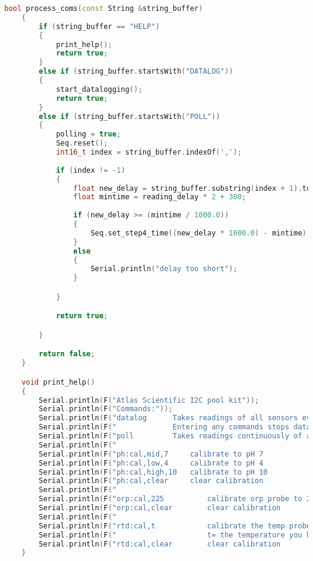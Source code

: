 \begin{lstlisting}[language=C++]
    bool process_coms(const String &string_buffer) 
    {
        if (string_buffer == "HELP") 
        {
            print_help();
            return true;
        }
        else if (string_buffer.startsWith("DATALOG")) 
        {
            start_datalogging();
            return true;
        }
        else if (string_buffer.startsWith("POLL")) 
        {
            polling = true;
            Seq.reset();
            int16_t index = string_buffer.indexOf(',');
            
            if (index != -1) 
            {
                float new_delay = string_buffer.substring(index + 1).toFloat();
                float mintime = reading_delay * 2 + 300;
                
                if (new_delay >= (mintime / 1000.0)) 
                {
                    Seq.set_step4_time((new_delay * 1000.0) - mintime);
                } 
                else 
                {
                    Serial.println("delay too short");
                }

            }

            return true;

        }

        return false;
    }

    void print_help() 
    {
        Serial.println(F("Atlas Scientific I2C pool kit"));
        Serial.println(F("Commands:"));
        Serial.println(F("datalog      Takes readings of all sensors every 15 sec send to thingspeak "));
        Serial.println(F("             Entering any commands stops datalog mode."));
        Serial.println(F("poll         Takes readings continuously of all sensors"));
        Serial.println(F("                                                                           "));
        Serial.println(F("ph:cal,mid,7     calibrate to pH 7                                         "));
        Serial.println(F("ph:cal,low,4     calibrate to pH 4                                         "));
        Serial.println(F("ph:cal,high,10   calibrate to pH 10                                        "));
        Serial.println(F("ph:cal,clear     clear calibration                                         "));
        Serial.println(F("                                                                           "));
        Serial.println(F("orp:cal,225          calibrate orp probe to 225mV                          "));
        Serial.println(F("orp:cal,clear        clear calibration                                     "));
        Serial.println(F("                                                                           "));
        Serial.println(F("rtd:cal,t            calibrate the temp probe to any temp value            "));
        Serial.println(F("                     t= the temperature you have chosen                    "));
        Serial.println(F("rtd:cal,clear        clear calibration                                     "));
    }
    
\end{lstlisting}

